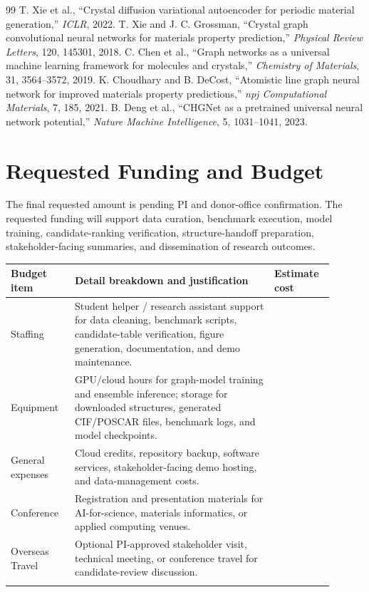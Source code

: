 \documentclass[10pt,a4paper]{article}
\newcommand{\blank}[1][7em]{\colorbox{yellow!35}{\rule{0pt}{1.05em}\hspace{#1}}}
\begin{document}
\begin{thebibliography}{99}
 T. Xie et al., ``Crystal diffusion variational autoencoder for periodic material generation,'' \textit{ICLR}, 2022.
 T. Xie and J. C. Grossman, ``Crystal graph convolutional neural networks for materials property prediction,'' \textit{Physical Review Letters}, 120, 145301, 2018.
 C. Chen et al., ``Graph networks as a universal machine learning framework for molecules and crystals,'' \textit{Chemistry of Materials}, 31, 3564--3572, 2019.
 K. Choudhary and B. DeCost, ``Atomistic line graph neural network for improved materials property predictions,'' \textit{npj Computational Materials}, 7, 185, 2021.
 B. Deng et al., ``CHGNet as a pretrained universal neural network potential,'' \textit{Nature Machine Intelligence}, 5, 1031--1041, 2023.
\end{thebibliography}
\normalsize

\vspace{-10pt}
\section{Requested Funding and Budget}
\vspace{-5pt}
The final requested amount is pending PI and donor-office confirmation. The requested funding will support data curation, benchmark execution, model training, candidate-ranking verification, structure-handoff preparation, stakeholder-facing summaries, and dissemination of research outcomes.
\vspace{-6pt}
\begin{table}[h!]
\centering
\small
\begin{tabular}{|>{\raggedright\arraybackslash}p{0.18\linewidth}|>{\raggedright\arraybackslash}p{0.57\linewidth}|>{\raggedright\arraybackslash}p{0.15\linewidth}|}
\hline
\textbf{Budget item} & \textbf{Detail breakdown and justification} & \textbf{Estimate cost} \\
\hline
Staffing & Student helper / research assistant support for data cleaning, benchmark scripts, candidate-table verification, figure generation, documentation, and demo maintenance. & \blank \\
\hline
Equipment & GPU/cloud hours for graph-model training and ensemble inference; storage for downloaded structures, generated CIF/POSCAR files, benchmark logs, and model checkpoints. & \blank \\
\hline
General expenses & Cloud credits, repository backup, software services, stakeholder-facing demo hosting, and data-management costs. & \blank \\
\hline
Conference & Registration and presentation materials for AI-for-science, materials informatics, or applied computing venues. & \blank \\
\hline
Overseas Travel & Optional PI-approved stakeholder visit, technical meeting, or conference travel for candidate-review discussion. & \blank \\
\hline
\multicolumn{2}{|r|}{\textbf{Total}} & \blank \\
\hline
\end{tabular}
\vspace{-18pt}
\end{table}
\end{document}
